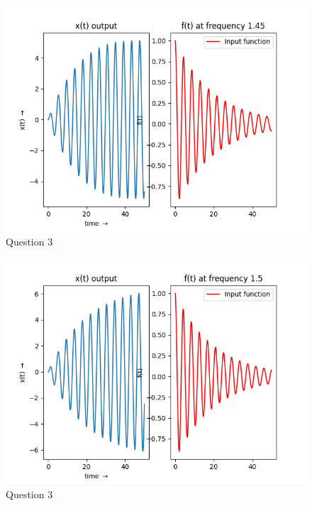 \documentclass[11pt, a4paper]{article}
\begin{document}
\begin{figure}[!tbh]
   	\centering
  \includegraphics[scale=0.5]{Q3-2.png} 
    \caption{Question 3} 	
    \label{time response q3.2}
   \end{figure} 

\begin{figure}[!tbh]
   	\centering
  \includegraphics[scale=0.5]{Q3-3.png} 
    \caption{Question 3} 	
    \label{time response q3.3}
   \end{figure} 
   
\end{document}

